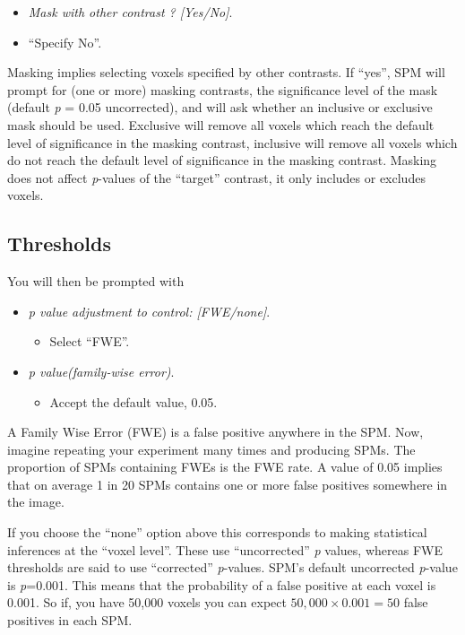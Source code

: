 \begin{itemize}
\item  \emph{Mask with other contrast ? [Yes/No]}.
\item ``Specify No''.
\end{itemize}

Masking implies selecting voxels specified by other contrasts. If ``yes'', SPM will prompt for (one or more) masking contrasts, the significance level of the mask (default \textit{p} = 0.05 uncorrected), and will ask whether an inclusive or exclusive mask should be used. Exclusive will remove all voxels which reach the default level of significance in the masking contrast, inclusive will remove all voxels which do not reach the default level of significance in the masking contrast. Masking does not affect \textit{p}-values of the ``target'' contrast, it only includes or excludes voxels.

\subsection{Thresholds}

You will then be prompted with

\begin{itemize}
\item \emph{p value adjustment to control: [FWE/none]}.
\begin{itemize}
\item Select ``FWE''.
\end{itemize}
\item \emph{p value(family-wise error)}.
\begin{itemize}
\item Accept the default value, 0.05.
\end{itemize}
\end{itemize}

A Family Wise Error (FWE) is a false positive anywhere in the SPM. Now, imagine repeating your experiment many times and producing SPMs. The proportion of SPMs containing FWEs is the FWE rate. A value of 0.05 implies that on average 1 in 20 SPMs contains one or more false positives somewhere in the image. 

If you choose the ``none'' option above this corresponds to making statistical inferences at the ``voxel level''. These use ``uncorrected'' \textit{p} values, whereas FWE thresholds are said to use ``corrected'' \textit{p}-values. SPM's default uncorrected \textit{p}-value is \textit{p}=0.001. This means that the probability of a false positive at each voxel is 0.001. So if, you have 50,000 voxels you can expect $50,000 \times 0.001 = 50$ false positives in each SPM.

